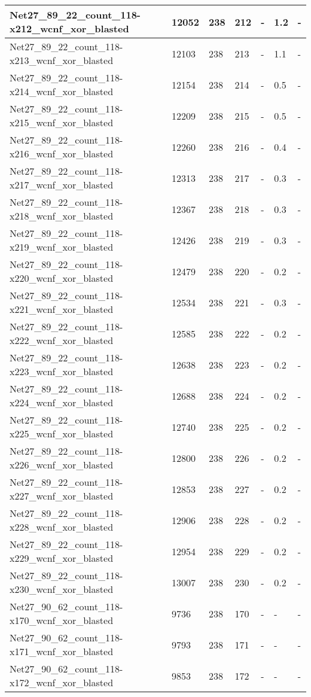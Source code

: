 \begin{scriptsize}
\begin{longtable}{|p{5cm}|l|l|l|l|l|l|}
Net27\_89\_22\_count\_118-x212\_wcnf\_xor\_blasted&12052&238&212&-&1.2&- \\ \hline 
Net27\_89\_22\_count\_118-x213\_wcnf\_xor\_blasted&12103&238&213&-&1.1&- \\ \hline 
Net27\_89\_22\_count\_118-x214\_wcnf\_xor\_blasted&12154&238&214&-&0.5&- \\ \hline 
Net27\_89\_22\_count\_118-x215\_wcnf\_xor\_blasted&12209&238&215&-&0.5&- \\ \hline 
Net27\_89\_22\_count\_118-x216\_wcnf\_xor\_blasted&12260&238&216&-&0.4&- \\ \hline 
Net27\_89\_22\_count\_118-x217\_wcnf\_xor\_blasted&12313&238&217&-&0.3&- \\ \hline 
Net27\_89\_22\_count\_118-x218\_wcnf\_xor\_blasted&12367&238&218&-&0.3&- \\ \hline 
Net27\_89\_22\_count\_118-x219\_wcnf\_xor\_blasted&12426&238&219&-&0.3&- \\ \hline 
Net27\_89\_22\_count\_118-x220\_wcnf\_xor\_blasted&12479&238&220&-&0.2&- \\ \hline 
Net27\_89\_22\_count\_118-x221\_wcnf\_xor\_blasted&12534&238&221&-&0.3&- \\ \hline 
Net27\_89\_22\_count\_118-x222\_wcnf\_xor\_blasted&12585&238&222&-&0.2&- \\ \hline 
Net27\_89\_22\_count\_118-x223\_wcnf\_xor\_blasted&12638&238&223&-&0.2&- \\ \hline 
Net27\_89\_22\_count\_118-x224\_wcnf\_xor\_blasted&12688&238&224&-&0.2&- \\ \hline 
Net27\_89\_22\_count\_118-x225\_wcnf\_xor\_blasted&12740&238&225&-&0.2&- \\ \hline 
Net27\_89\_22\_count\_118-x226\_wcnf\_xor\_blasted&12800&238&226&-&0.2&- \\ \hline 
Net27\_89\_22\_count\_118-x227\_wcnf\_xor\_blasted&12853&238&227&-&0.2&- \\ \hline 
Net27\_89\_22\_count\_118-x228\_wcnf\_xor\_blasted&12906&238&228&-&0.2&- \\ \hline 
Net27\_89\_22\_count\_118-x229\_wcnf\_xor\_blasted&12954&238&229&-&0.2&- \\ \hline 
Net27\_89\_22\_count\_118-x230\_wcnf\_xor\_blasted&13007&238&230&-&0.2&- \\ \hline 
Net27\_90\_62\_count\_118-x170\_wcnf\_xor\_blasted&9736&238&170&-&-&- \\ \hline 
Net27\_90\_62\_count\_118-x171\_wcnf\_xor\_blasted&9793&238&171&-&-&- \\ \hline 
Net27\_90\_62\_count\_118-x172\_wcnf\_xor\_blasted&9853&238&172&-&-&- \\ \hline 

\end{longtable}
\end{scriptsize}
